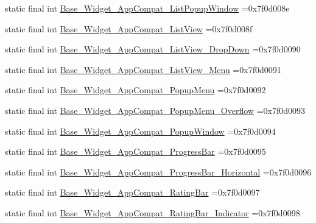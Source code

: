 \begin{DoxyCompactItemize}
\item 
static final int \mbox{\hyperlink{classcom_1_1example_1_1trainawearapplication_1_1_r_1_1style_af424bed5ee105d4699f3deba3f011c7e}{Base\+\_\+\+Widget\+\_\+\+App\+Compat\+\_\+\+List\+Popup\+Window}} =0x7f0d008e
\item 
static final int \mbox{\hyperlink{classcom_1_1example_1_1trainawearapplication_1_1_r_1_1style_ab9019ad06486f64670c19fd8477a48ab}{Base\+\_\+\+Widget\+\_\+\+App\+Compat\+\_\+\+List\+View}} =0x7f0d008f
\item 
static final int \mbox{\hyperlink{classcom_1_1example_1_1trainawearapplication_1_1_r_1_1style_aecb69195dd42e2e74e7899d9a47ce5ae}{Base\+\_\+\+Widget\+\_\+\+App\+Compat\+\_\+\+List\+View\+\_\+\+Drop\+Down}} =0x7f0d0090
\item 
static final int \mbox{\hyperlink{classcom_1_1example_1_1trainawearapplication_1_1_r_1_1style_a24cd31fcdb23d7342df18c7c9a7eb173}{Base\+\_\+\+Widget\+\_\+\+App\+Compat\+\_\+\+List\+View\+\_\+\+Menu}} =0x7f0d0091
\item 
static final int \mbox{\hyperlink{classcom_1_1example_1_1trainawearapplication_1_1_r_1_1style_ad11b91ec6bee94d6310e3999182b2ad8}{Base\+\_\+\+Widget\+\_\+\+App\+Compat\+\_\+\+Popup\+Menu}} =0x7f0d0092
\item 
static final int \mbox{\hyperlink{classcom_1_1example_1_1trainawearapplication_1_1_r_1_1style_ad0d708ac0674bb99ebd97f306801f7e2}{Base\+\_\+\+Widget\+\_\+\+App\+Compat\+\_\+\+Popup\+Menu\+\_\+\+Overflow}} =0x7f0d0093
\item 
static final int \mbox{\hyperlink{classcom_1_1example_1_1trainawearapplication_1_1_r_1_1style_a91f7252e903dfd9f7e96df9e4c729717}{Base\+\_\+\+Widget\+\_\+\+App\+Compat\+\_\+\+Popup\+Window}} =0x7f0d0094
\item 
static final int \mbox{\hyperlink{classcom_1_1example_1_1trainawearapplication_1_1_r_1_1style_aa10a54f239fdff71c320590d9df17fac}{Base\+\_\+\+Widget\+\_\+\+App\+Compat\+\_\+\+Progress\+Bar}} =0x7f0d0095
\item 
static final int \mbox{\hyperlink{classcom_1_1example_1_1trainawearapplication_1_1_r_1_1style_a294cefcdab1292296bd9e2da230495f9}{Base\+\_\+\+Widget\+\_\+\+App\+Compat\+\_\+\+Progress\+Bar\+\_\+\+Horizontal}} =0x7f0d0096
\item 
static final int \mbox{\hyperlink{classcom_1_1example_1_1trainawearapplication_1_1_r_1_1style_a9516eba82b092fe43ae562efe8ef7db8}{Base\+\_\+\+Widget\+\_\+\+App\+Compat\+\_\+\+Rating\+Bar}} =0x7f0d0097
\item 
static final int \mbox{\hyperlink{classcom_1_1example_1_1trainawearapplication_1_1_r_1_1style_a6a88dca510c24fc5210ff7754ab75c5c}{Base\+\_\+\+Widget\+\_\+\+App\+Compat\+\_\+\+Rating\+Bar\+\_\+\+Indicator}} =0x7f0d0098

\end{DoxyCompactItemize}
